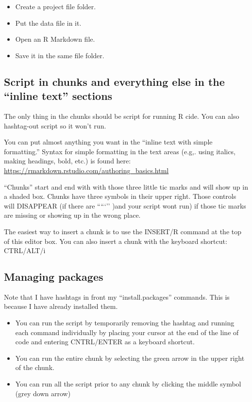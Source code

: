 \documentclass[
  english,
]{book}
\providecommand{\tightlist}{%
  \setlength{\itemsep}{0pt}\setlength{\parskip}{0pt}}
\begin{document}
\begin{itemize}
\tightlist
\item
  Create a project file folder.
\item
  Put the data file in it.
\item
  Open an R Markdown file.
\item
  Save it in the same file folder.
\end{itemize}

\hypertarget{script-in-chunks-and-everything-else-in-the-inline-text-sections}{%
\subsection{Script in chunks and everything else in the ``inline text'' sections}\label{script-in-chunks-and-everything-else-in-the-inline-text-sections}}

The only thing in the chunks should be script for running R cide. You can also hashtag-out script so it won't run.

You can put almost anything you want in the ``inline text with simple formatting.'' Syntax for simple formatting in the text areas (e.g,. using italics, making headings, bold, etc.) is found here: \url{https://rmarkdown.rstudio.com/authoring_basics.html}

``Chunks'' start and end with with those three little tic marks and will show up in a shaded box. Chunks have three symbols in their upper right. Those controls will DISAPPEAR (if there are `````'' )and your script wont run) if those tic marks are missing or showing up in the wrong place.

The easiest way to insert a chunk is to use the INSERT/R command at the top of this editor box. You can also insert a chunk with the keyboard shortcut: CTRL/ALT/i

\hypertarget{managing-packages}{%
\subsection{Managing packages}\label{managing-packages}}

Note that I have hashtags in front my ``install.packages'' commands. This is because I have already installed them.

\begin{itemize}
\tightlist
\item
  You can run the script by temporarily removing the hashtag and running each command individually by placing your cursor at the end of the line of code and entering CNTRL/ENTER as a keyboard shortcut.\\
\item
  You can run the entire chunk by selecting the green arrow in the upper right of the chunk.
\item
  You can run all the script prior to any chunk by clicking the middle symbol (grey down arrow)
\end{itemize}
\end{document}
